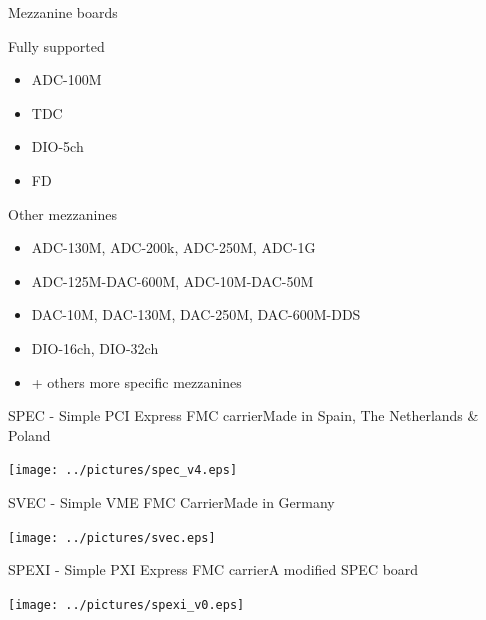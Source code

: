 \documentclass[compress,red]{beamer}
\begin{document}
\begin{frame}{Mezzanine boards}

  \begin{block}{Fully supported}
    \begin{itemize}
    \item ADC-100M
    \item TDC
    \item DIO-5ch
    \item FD
    \end{itemize}
  \end{block}

  \begin{block}{Other mezzanines}
    \begin{itemize}
    \item ADC-130M, ADC-200k, ADC-250M, ADC-1G
    \item ADC-125M-DAC-600M, ADC-10M-DAC-50M
    \item DAC-10M, DAC-130M, DAC-250M, DAC-600M-DDS
    \item DIO-16ch, DIO-32ch
    \item + others more specific mezzanines
    \end{itemize}
  \end{block}

\end{frame}

\begin{frame}{SPEC - Simple PCI Express FMC carrier}{Made in Spain, The Netherlands \& Poland}

  \begin{center}
    \texttt{[image: ../pictures/spec\_v4.eps]}
  \end{center}

\end{frame}

\begin{frame}{SVEC - Simple VME FMC Carrier}{Made in Germany}

  \begin{center}
    \texttt{[image: ../pictures/svec.eps]}
  \end{center}

\end{frame}

\begin{frame}{SPEXI - Simple PXI Express FMC carrier}{A modified SPEC board}

  \begin{center}
    \texttt{[image: ../pictures/spexi\_v0.eps]}
  \end{center}

\end{frame}
\end{document}
